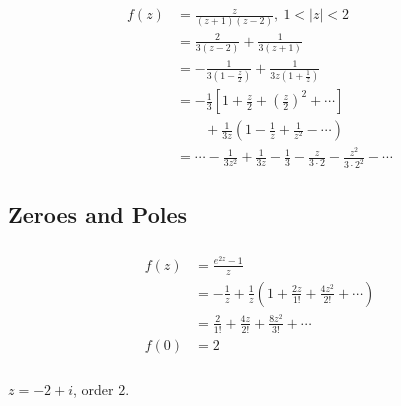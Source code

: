 \documentclass{article}
\begin{document}
\begin{align*}
  f(z) & = \frac{z}{(z + 1) (z - 2)},\ 1 < |z| < 2                                                                         \\
       & = \frac{2}{3 (z - 2)} + \frac{1}{3 (z + 1)}                                                                       \\
       & = -\frac{1}{3 \left( 1 - \frac{z}{2} \right)} + \frac{1}{3 z \left( 1 + \frac{1}{z} \right)}                      \\
       & = -\frac{1}{3} \left[ 1 + \frac{z}{2} + \left( \frac{z}{2} \right)^2 + \cdots \right]                             \\
       & \qquad + \frac{1}{3 z} \left( 1 - \frac{1}{z} + \frac{1}{z^2} - \cdots \right)                                    \\
       & = \cdots - \frac{1}{3 z^2} + \frac{1}{3 z} - \frac{1}{3} - \frac{z}{3 \cdot 2} - \frac{z^2}{3 \cdot 2^2} - \cdots
\end{align*}

\subsection{Zeroes and Poles}

\subsubsection{}

\begin{align*}
  f(z) & = \frac{e^{2 z} - 1}{z}                                                                    \\
       & = -\frac{1}{z} + \frac{1}{z} \left( 1 + \frac{2 z}{1!} + \frac{4 z^2}{2!} + \cdots \right) \\
       & = \frac{2}{1!} + \frac{4 z}{2!} + \frac{8 z^2}{3!} + \cdots                                \\
  f(0) & = 2
\end{align*}

\setcounter{subsubsection}{2}
\subsubsection{}

$z = -2 + i$, order $2$.

\setcounter{subsubsection}{4}
\subsubsection{}
\end{document}
